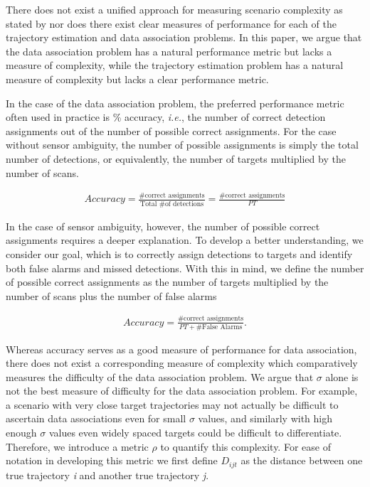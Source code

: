 There does not exist a unified approach for measuring scenario complexity as stated by \cite{MTT-Taxonomy} nor does there exist clear measures of performance for each of the trajectory estimation and data association problems. In this paper, we argue that the data association problem has a natural performance metric but lacks a measure of complexity, while the trajectory estimation problem has a natural measure of complexity but lacks a clear performance metric. 

In the case of the data association problem, the preferred performance metric often used in practice is \% accuracy, \textit{i.e.}, the number of correct detection assignments out of the number of possible correct assignments. For the case without sensor ambiguity, the number of possible assignments is simply the total number of detections, or equivalently, the number of targets multiplied by the number of scans. 

\begin{align}
Accuracy =  \frac{\text{\# correct assignments}}{\text{Total \# of detections}}= \frac{\text{\# correct assignments}}{PT}
\end{align}

In the case of sensor ambiguity, however, the number of possible correct assignments requires a deeper explanation. To develop a better understanding, we consider our goal, which is to correctly assign detections to targets and identify both false alarms and missed detections. With this in mind, we define the number of possible correct assignments as the number of targets multiplied by the number of scans plus the number of false alarms

\begin{align}
Accuracy =  \frac{\text{\# correct assignments}}{PT + \text{\# False Alarms}}.
\end{align}

Whereas accuracy serves as a good measure of performance for data association, there does not exist a corresponding measure of complexity which comparatively measures the difficulty of the data association problem. We argue that $\sigma$ alone is not the best measure of difficulty for the data association problem. For example, a scenario with very close target trajectories may not actually be difficult to ascertain data associations even for small $\sigma$ values, and similarly with high enough $\sigma$ values even widely spaced targets could be difficult to differentiate. Therefore, we introduce a metric $\rho$ to quantify this complexity. For ease of notation in developing this metric we first define $D_{ijt}$ as the distance between one true trajectory \textit{i} and another true trajectory \textit{j}.

